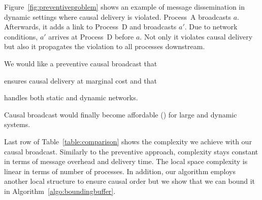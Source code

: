 Figure~\ref{fig:preventiveproblem} shows an example of message dissemination in
dynamic settings where causal delivery is violated. Process~A broadcasts $a$.
Afterwards, it adds a link to Process~D and broadcasts $a'$. Due to network
conditions, $a'$ arrives at Process~D before $a$. Not only it violates causal
delivery but also it propagates the violation to all processes downstream.

We would like a preventive causal broadcast that
\begin{inparaenum}[(i)]
\item ensures causal delivery at marginal cost and that
\item handles both static and dynamic networks.
\end{inparaenum}
Causal broadcast would finally become affordable () for
large and dynamic systems.

%     


Last row of Table~\ref{table:comparison} shows the complexity we achieve with
our causal broadcast. Similarly to the preventive approach, complexity stays
constant in terms of message overhead and delivery time. The local space
complexity is linear in terms of number of processes.  In addition, our algorithm employs another
local structure to ensure causal order but we show that we can bound it in
Algorithm~\ref{algo:boundingbuffer}.



